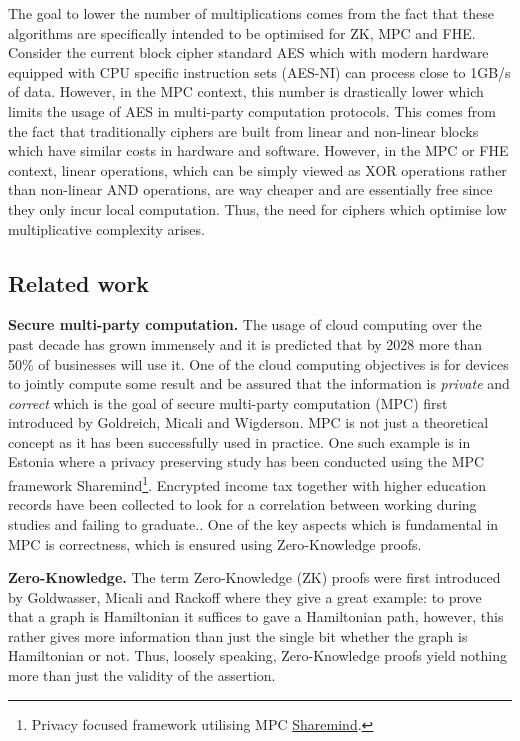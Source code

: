 \documentclass{Resources/UoBLab1}
\theoremstyle{definition}
\begin{document}
The goal to lower the number of multiplications comes from the fact that these algorithms are specifically intended to be optimised for ZK, MPC and FHE. Consider the current block cipher standard AES which with modern hardware equipped with CPU specific instruction sets (AES-NI) can process close to 1GB/s\cite{AESNI} of data. However, in the MPC context, this number is drastically lower which limits the usage of AES in multi-party computation protocols\cite{AESInMPC}. This comes from the fact that traditionally ciphers are built from linear and non-linear blocks which have similar costs in hardware and software. However, in the MPC or FHE context, linear operations, which can be simply viewed as XOR operations rather than non-linear AND operations, are way cheaper and are essentially free since they only incur local computation. Thus, the need for ciphers which optimise low multiplicative complexity arises.

\subsection{Related work}
\textbf{Secure multi-party computation.} The usage of cloud computing over the past decade has grown immensely and it is predicted that by 2028 more than 50\% of businesses will use it\cite{CloudTrend}. One of the cloud computing objectives is for devices to jointly compute some result and be assured that the information is \textit{private} and \textit{correct} which is the goal of secure multi-party computation (MPC) first introduced by Goldreich, Micali and Wigderson\cite{MPCFirst}. MPC is not just a theoretical concept as it has been successfully used in practice. One such example is in Estonia where a privacy preserving study has been conducted using the MPC framework Sharemind\footnote{Privacy focused framework utilising MPC \href{https://sharemind.cyber.ee}{Sharemind}.}. Encrypted income tax together with higher education records have been collected to look for a correlation between working during studies and failing to graduate.\cite{Estija}. One of the key aspects which is fundamental in MPC is correctness, which is ensured using Zero-Knowledge proofs.\medskip

\noindent\textbf{Zero-Knowledge.} The term Zero-Knowledge (ZK) proofs were first introduced by Goldwasser, Micali and Rackoff\cite{ZKOrigin} where they give a great example: to prove that a graph is Hamiltonian it suffices to gave a Hamiltonian path, however, this rather gives more information than just the single bit whether the graph is Hamiltonian or not. Thus, loosely speaking, Zero-Knowledge proofs yield nothing more than just the validity of the assertion.
\end{document}
